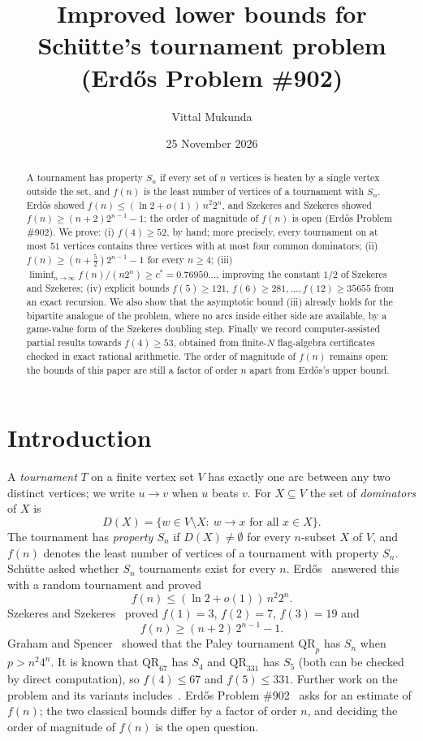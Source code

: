 \documentclass[11pt]{amsart}
\title[Lower bounds for Sch\"utte's tournament problem]{Improved lower bounds for Sch\"utte's tournament problem\\ (Erd\H{o}s Problem \#902)}
\author{Vittal Mukunda}
\date{25 November 2026}
\theoremstyle{definition}
\theoremstyle{remark}
\newcommand{\D}{D}
\newcommand{\QR}{\mathrm{QR}}
\newcommand{\cs}{c^{*}}
\begin{document}
\begin{abstract}
A tournament has property $S_n$ if every set of $n$ vertices is beaten by a single vertex outside the set, and $f(n)$ is the least
number of vertices of a tournament with $S_n$. Erd\H{o}s showed $f(n)\le(\ln 2+o(1))\,n^2 2^n$, and Szekeres and Szekeres showed
$f(n)\ge (n+2)2^{n-1}-1$; the order of magnitude of $f(n)$ is open (Erd\H{o}s Problem \#902).
We prove:
(i) $f(4)\ge 52$, by hand; more precisely, every tournament on at most $51$ vertices contains three vertices with at most four common
dominators;
(ii) $f(n)\ge (n+\tfrac52)2^{n-1}-1$ for every $n\ge 4$;
(iii) $\liminf_{n\to\infty} f(n)/(n2^n)\ge \cs=0.76950\ldots$, improving the constant $1/2$ of Szekeres and Szekeres;
(iv) explicit bounds $f(5)\ge 121$, $f(6)\ge 281,\dots, f(12)\ge 35655$ from an exact recursion.
We also show that the asymptotic bound (iii) already holds for the bipartite analogue of the problem, where no arcs inside either
side are available, by a game-value form of the Szekeres doubling step. Finally we record computer-assisted partial results towards
$f(4)\ge 53$, obtained from finite-$N$ flag-algebra certificates checked in exact rational arithmetic. The order of magnitude of $f(n)$
remains open: the bounds of this paper are still a factor of order $n$ apart from Erd\H{o}s's upper bound.
\end{abstract}

\maketitle

\section{Introduction}

A \emph{tournament} $T$ on a finite vertex set $V$ has exactly one arc between any two distinct vertices; we write $u\to v$ when $u$
beats $v$. For $X\subseteq V$ the set of \emph{dominators} of $X$ is
\[
  \D(X)=\{w\in V\setminus X:\ w\to x\text{ for all }x\in X\}.
\]
The tournament has \emph{property $S_n$} if $\D(X)\neq\emptyset$ for every $n$-subset $X$ of $V$, and $f(n)$ denotes the least
number of vertices of a tournament with property $S_n$. Sch\"utte asked whether $S_n$ tournaments exist for every $n$.
Erd\H{o}s~\cite{Erdos63} answered this with a random tournament and proved
\[
  f(n)\le (\ln 2+o(1))\,n^2 2^n .
\]
Szekeres and Szekeres~\cite{SS65} proved $f(1)=3$, $f(2)=7$, $f(3)=19$ and
\begin{equation}\label{eq:SS}
  f(n)\ge (n+2)\,2^{n-1}-1 .
\end{equation}
Graham and Spencer~\cite{GS71} showed that the Paley tournament $\QR_p$ has $S_n$ when $p>n^2 4^n$. It is known that $\QR_{67}$
has $S_4$ and $\QR_{331}$ has $S_5$ (both can be checked by direct computation), so $f(4)\le 67$ and $f(5)\le 331$. Further work on the problem and its variants
includes~\cite{RMHH04,BGHT03,Tys00,Jef26}. Erd\H{o}s Problem \#902~\cite{EP902} asks for an estimate of $f(n)$; the two classical
bounds differ by a factor of order $n$, and deciding the order of magnitude of $f(n)$ is the open question.
\end{document}
